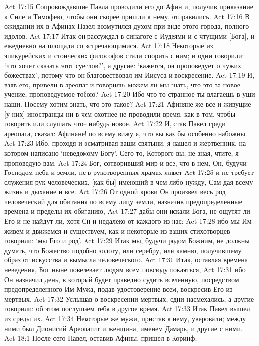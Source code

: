 Act 17:15  Сопровождавшие Павла проводили его до Афин и, получив приказание к Силе и Тимофею, чтобы они скорее пришли к нему, отправились.
Act 17:16  В ожидании их в Афинах Павел возмутился духом при виде этого города, полного идолов.
Act 17:17  Итак он рассуждал в синагоге с Иудеями и с чтущими [Бога], и ежедневно на площади со встречающимися.
Act 17:18  Некоторые из эпикурейских и стоических философов стали спорить с ним; и одни говорили: `что хочет сказать этот суеслов?', а другие: `кажется, он проповедует о чужих божествах', потому что он благовествовал им Иисуса и воскресение.
Act 17:19  И, взяв его, привели в ареопаг и говорили: можем ли мы знать, что это за новое учение, проповедуемое тобою?
Act 17:20  Ибо что-то странное ты влагаешь в уши наши. Посему хотим знать, что это такое?
Act 17:21  Афиняне же все и живущие [у них] иностранцы ни в чем охотнее не проводили время, как в том, чтобы говорить или слушать что-- нибудь новое.
Act 17:22  И, став Павел среди ареопага, сказал: Афиняне! по всему вижу я, что вы как бы особенно набожны.
Act 17:23  Ибо, проходя и осматривая ваши святыни, я нашел и жертвенник, на котором написано `неведомому Богу'. Сего-то, Которого вы, не зная, чтите, я проповедую вам.
Act 17:24  Бог, сотворивший мир и все, что в нем, Он, будучи Господом неба и земли, не в рукотворенных храмах живет
Act 17:25  и не требует служения рук человеческих, [как бы] имеющий в чем-либо нужду, Сам дая всему жизнь и дыхание и все.
Act 17:26  От одной крови Он произвел весь род человеческий для обитания по всему лицу земли, назначив предопределенные времена и пределы их обитанию,
Act 17:27  дабы они искали Бога, не ощутят ли Его и не найдут ли, хотя Он и недалеко от каждого из нас:
Act 17:28  ибо мы Им живем и движемся и существуем, как и некоторые из ваших стихотворцев говорили: `мы Его и род'.
Act 17:29  Итак мы, будучи родом Божиим, не должны думать, что Божество подобно золоту, или серебру, или камню, получившему образ от искусства и вымысла человеческого.
Act 17:30  Итак, оставляя времена неведения, Бог ныне повелевает людям всем повсюду покаяться,
Act 17:31  ибо Он назначил день, в который будет праведно судить вселенную, посредством предопределенного Им Мужа, подав удостоверение всем, воскресив Его из мертвых.
Act 17:32  Услышав о воскресении мертвых, одни насмехались, а другие говорили: об этом послушаем тебя в другое время.
Act 17:33  Итак Павел вышел из среды их.
Act 17:34  Некоторые же мужи, пристав к нему, уверовали; между ними был Дионисий Ареопагит и женщина, именем Дамарь, и другие с ними.
Act 18:1  После сего Павел, оставив Афины, пришел в Коринф;
